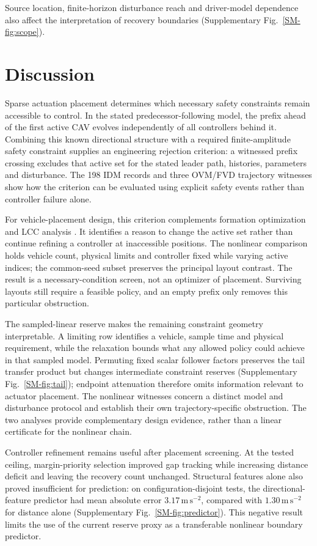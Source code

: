 \documentclass[12pt]{article}
\begin{document}
Source location, finite-horizon disturbance reach and driver-model dependence also affect the interpretation of recovery boundaries (Supplementary Fig.~\ref{SM-fig:scope}).

\FloatBarrier
\section*{Discussion}
Sparse actuation placement determines which necessary safety constraints remain accessible to control. In the stated predecessor-following model, the prefix ahead of the first active CAV evolves independently of all controllers behind it. Combining this known directional structure with a required finite-amplitude safety constraint supplies an engineering rejection criterion: a witnessed prefix crossing excludes that active set for the stated leader path, histories, parameters and disturbance. The 198 IDM records and three OVM/FVD trajectory witnesses show how the criterion can be evaluated using explicit safety events rather than controller failure alone.

For vehicle-placement design, this criterion complements formation optimization and LCC analysis \cite{li2022cooperative,wang2022lcc}. It identifies a reason to change the active set rather than continue refining a controller at inaccessible positions. The nonlinear comparison holds vehicle count, physical limits and controller fixed while varying active indices; the common-seed subset preserves the principal layout contrast. The result is a necessary-condition screen, not an optimizer of placement. Surviving layouts still require a feasible policy, and an empty prefix only removes this particular obstruction.

The sampled-linear reserve makes the remaining constraint geometry interpretable. A limiting row identifies a vehicle, sample time and physical requirement, while the relaxation bounds what any allowed policy could achieve in that sampled model. Permuting fixed scalar follower factors preserves the tail transfer product but changes intermediate constraint reserves (Supplementary Fig.~\ref{SM-fig:tail}); endpoint attenuation therefore omits information relevant to actuator placement. The nonlinear witnesses concern a distinct model and disturbance protocol and establish their own trajectory-specific obstruction. The two analyses provide complementary design evidence, rather than a linear certificate for the nonlinear chain.

Controller refinement remains useful after placement screening. At the tested ceiling, margin-priority selection improved gap tracking while increasing distance deficit and leaving the recovery count unchanged. Structural features alone also proved insufficient for prediction: on configuration-disjoint tests, the directional-feature predictor had mean absolute error $3.17\,\mathrm{m\,s^{-2}}$, compared with $1.30\,\mathrm{m\,s^{-2}}$ for distance alone (Supplementary Fig.~\ref{SM-fig:predictor}). This negative result limits the use of the current reserve proxy as a transferable nonlinear boundary predictor.
\end{document}
